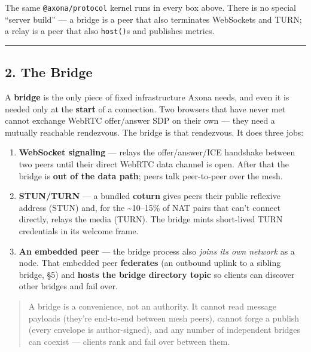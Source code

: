 \documentclass[
  nobib]{tufte-handout}
\providecommand{\tightlist}{%
  \setlength{\itemsep}{0pt}\setlength{\parskip}{0pt}}
\renewcommand{\subsubsection}[1]{\medskip\par\noindent{\normalsize\bfseries #1}\par\nobreak\smallskip}
\begin{document}
The same \texttt{@axona/protocol} kernel runs in every box above. There
is no special ``server build'' --- a bridge is a peer that also
terminates WebSockets and TURN; a relay is a peer that also
\texttt{host()}s and publishes metrics.

\begin{center}\rule{0.5\linewidth}{0.5pt}\end{center}

\subsection{2. The Bridge}\label{the-bridge}

\subsubsection{What it is}\label{what-it-is}

A \textbf{bridge} is the only piece of fixed infrastructure Axona needs,
and even it is needed only at the \textbf{start} of a connection. Two
browsers that have never met cannot exchange WebRTC offer/answer SDP on
their own --- they need a mutually reachable rendezvous. The bridge is
that rendezvous. It does three jobs:

\begin{enumerate}
\def\labelenumi{\arabic{enumi}.}
\tightlist
\item
  \textbf{WebSocket signaling} --- relays the offer/answer/ICE handshake
  between two peers until their direct WebRTC data channel is open.
  After that the bridge is \textbf{out of the data path}; peers talk
  peer-to-peer over the mesh.
\item
  \textbf{STUN/TURN} --- a bundled \textbf{coturn} gives peers their
  public reflexive address (STUN) and, for the \textasciitilde10--15\%
  of NAT pairs that can't connect directly, relays the media (TURN). The
  bridge mints short-lived TURN credentials in its welcome frame.
\item
  \textbf{An embedded peer} --- the bridge process also \emph{joins its
  own network} as a node. That embedded peer \textbf{federates} (an
  outbound uplink to a sibling bridge, §5) and \textbf{hosts the bridge
  directory topic} so clients can discover other bridges and fail over.
\end{enumerate}

\begin{quote}
A bridge is a convenience, not an authority. It cannot read message
payloads (they're end-to-end between mesh peers), cannot forge a publish
(every envelope is author-signed), and any number of independent bridges
can coexist --- clients rank and fail over between them.
\end{quote}
\end{document}
